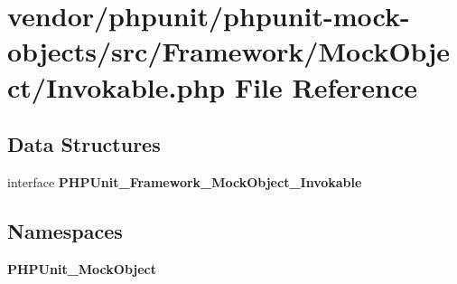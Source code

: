 \section{vendor/phpunit/phpunit-\/mock-\/objects/src/\+Framework/\+Mock\+Object/\+Invokable.php File Reference}
\label{_invokable_8php}
\subsection*{Data Structures}
\begin{DoxyCompactItemize}
\item 
interface {\bf P\+H\+P\+Unit\+\_\+\+Framework\+\_\+\+Mock\+Object\+\_\+\+Invokable}
\end{DoxyCompactItemize}
\subsection*{Namespaces}
\begin{DoxyCompactItemize}
\item 
 {\bf P\+H\+P\+Unit\+\_\+\+Mock\+Object}
\end{DoxyCompactItemize}
